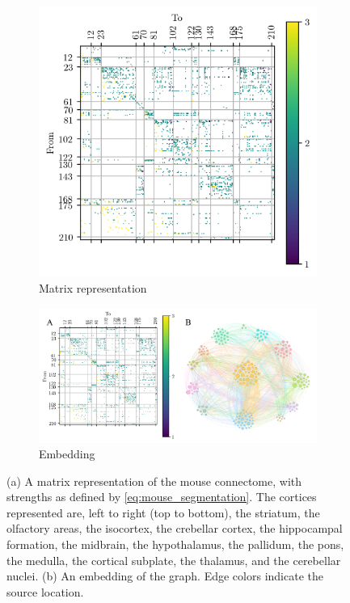 \begin{figure}[ht]
  \centering
  \begin{subfigure}{0.45\textwidth}
    \centering
    \includegraphics[width=\textwidth]{figure/n}
    \caption{Matrix representation}
    \label{fig:mouse_matrix}
  \end{subfigure} %
  \begin{subfigure}{0.45\textwidth}
    \centering
    \includegraphics[width=\textwidth]{figure/network}
    \caption{Embedding}
    \label{fig:mouse_embedding}
  \end{subfigure}
  \caption[Mouse connectome]{(a) A matrix representation of the mouse connectome, with strengths as defined by \cref{eq:mouse_segmentation}.
    The cortices represented are, left to right (top to bottom),
    the striatum,
    the olfactory areas,
    the isocortex,
    the crebellar cortex,
    the hippocampal formation,
    the midbrain,
    the hypothalamus,
    the pallidum,
    the pons,
    the medulla,
    the cortical subplate,
    the thalamus,
    and the cerebellar nuclei.
    (b) An embedding of the graph.
    Edge colors indicate the source location.
  }
  \label{fig:mouse_connectome}
\end{figure}

